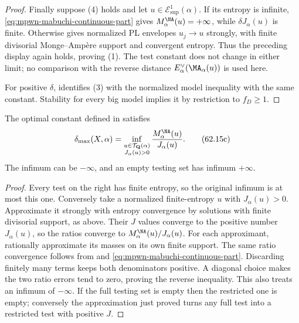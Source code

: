 \begin{proof}
Finally suppose (4) holds and let $u\in\mathcal E^1_{\sup}(\alpha)$.
If its entropy is infinite, \eqref{eq:mpwn-mabuchi-continuous-part}
gives $M_\alpha^{\NA}(u)=+\infty$, while $\delta J_\alpha(u)$ is
finite. Otherwise  gives
normalized PL envelopes $u_j\to u$ strongly, with finite divisorial
Monge--Amp\`ere support and convergent entropy. Thus the preceding
display again holds, proving (1). The test constant does not change
in either limit; no comparison with the reverse distance
$E_\alpha^\vee(\MA_\alpha(u))$ is used here.

For positive $\delta$, 
identifies (3) with the normalized model inequality with the same
constant. Stability for every big model implies it by restriction
to $f_D\geq1$.
\end{proof}

\begin{corollary}\label{cor:mpwn-rational-stability-threshold}
The optimal constant defined in
 satisfies
\[
 \delta_{\max}(X,\alpha)
    =\inf_{\substack{u\in\mathcal T_{\mathbf Q}(\alpha)\\
                          J_\alpha(u)>0}}
                       \frac{M_\alpha^{\NA}(u)}{J_\alpha(u)}.
\tag{62.15c}\label{eq:mpwn-rational-stability-threshold}
\]
The infimum can be $-\infty$, and an empty testing set has
infimum $+\infty$.
\end{corollary}

\begin{proof}
Every test on the right has finite entropy, so the original
infimum is at most this one. Conversely take a normalized
finite-entropy $u$ with $J_\alpha(u)>0$. Approximate it strongly
with entropy convergence by solutions with finite divisorial support, as above.
Their $J$ values converge to the positive number $J_\alpha(u)$,
so the ratios converge to $M_\alpha^{\NA}(u)/J_\alpha(u)$.
For each approximant, rationally approximate its masses on its
own finite support. The same ratio convergence follows from
 and
\eqref{eq:mpwn-mabuchi-continuous-part}. Discarding finitely many terms keeps both denominators positive.
A diagonal choice makes the two ratio errors tend to zero,
proving the reverse inequality.
This also treats an infimum of $-\infty$. If the full testing set
is empty then the restricted one is empty; conversely the
approximation just proved turns any full test into a restricted
test with positive $J$.
\end{proof}

